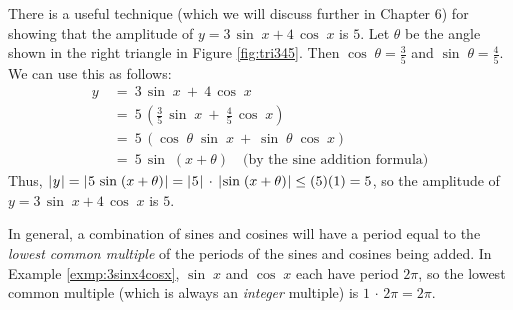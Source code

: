 \begin{exmp}
\piccaption[]{\label{fig:tri345}}
There is a useful technique (which we will discuss further in Chapter 6) for showing that the
amplitude of $y=3\,\sin\;x + 4\,\cos\;x$ is $5$. Let $\theta$ be the angle shown in the right
triangle in Figure \ref{fig:tri345}. Then $\cos\;\theta = \frac{3}{5}$ and $\sin\;\theta =
\frac{4}{5}$. We can use this as follows:
\begin{align*}
 y ~&=~ 3\,\sin\;x ~+~ 4\,\cos\;x\\
 &=~ 5\,\left( \tfrac{3}{5}\,\sin\;x ~+~ \tfrac{4}{5}\,\cos\;x \right)\\
 &=~ 5\,( \cos\;\theta\;\sin\;x ~+~ \sin\;\theta\;\cos\;x )\\
 &=~ 5\,\sin\;(x+\theta)\quad\text{(by the sine addition formula)}
\end{align*}
Thus, $\lvert\mspace{1mu}y\mspace{1mu}\rvert = \lvert\mspace{1mu}5\,\sin\;(x+\theta)\mspace{1mu}\rvert = \lvert\mspace{1mu}5\mspace{1mu}\rvert\,\cdot\,\lvert\mspace{1mu}\sin\;(x+\theta)\mspace{1mu}\rvert \le (5)(1) = 5$,
so the amplitude of $y=3\,\sin\;x + 4\,\cos\;x$ is $5$.
\end{exmp}\vspace{-3mm}
\divider\vspace{-2mm}
\newpage
In general, a combination of sines and cosines will have a period equal to the \emph{lowest common
multiple} of the periods of the sines and cosines being added. In Example \ref{exmp:3sinx4cosx},
$\sin\;x$ and $\cos\;x$ each have period $2\pi$, so the lowest common multiple (which is always an
\emph{integer} multiple) is $1 \,\cdot\, 2\pi = 2\pi$.

